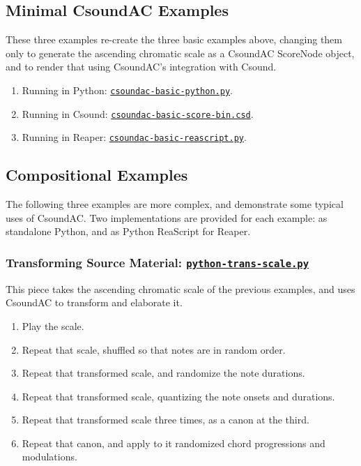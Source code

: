 \documentclass[letterpaper,10pt,DIV=12,parskip=half]{scrartcl}
\begin{document}
\subsection{Minimal CsoundAC Examples}

These three examples re-create the three basic examples above, changing them only to generate the ascending chromatic scale as a CsoundAC ScoreNode object, and to render that using CsoundAC's integration with Csound.

\begin{enumerate}

\item Running in Python: \href{https://github.com/gogins/csound-ac/blob/master/user-guide/csoundac-basic-python.py}{\lstinline|csoundac-basic-python.py|}.

\item Running in Csound: \href{https://github.com/gogins/csound-ac/blob/master/user-guide/csoundac-basic-score-bin.csd}{\lstinline|csoundac-basic-score-bin.csd|}.

\item Running in Reaper: \href{https://github.com/gogins/csound-ac/blob/master/user-guide/csoundac-basic-reascript.py}{\lstinline|csoundac-basic-reascript.py|}.

\end{enumerate}

\subsection{Compositional Examples}

The following three examples are more complex, and demonstrate some typical uses of CsoundAC. Two implementations are provided for each example: as standalone Python, and as Python ReaScript for Reaper.

\subsubsection{Transforming Source Material: \href{https://github.com/gogins/csound-ac/blob/master/user-guide/python-trans-scale.py}{\lstinline|python-trans-scale.py|}}

This piece takes the ascending chromatic scale of the previous examples, and uses CsoundAC to transform and elaborate it. 

\begin{enumerate}
\item Play the scale.
\item Repeat that scale, shuffled so that notes are in random order.
\item Repeat that transformed scale, and randomize the note durations.
\item Repeat that transformed scale, quantizing the note onsets and durations.
\item Repeat that transformed scale three times, as a canon at the third.
\item Repeat that canon, and apply to it randomized chord progressions and modulations.
\end{enumerate}
\end{document}
